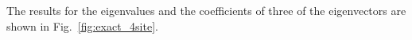 The results for the eigenvalues and the coefficients of three of the
eigenvectors are shown in Fig.~\ref{fig:exact_4site}.
